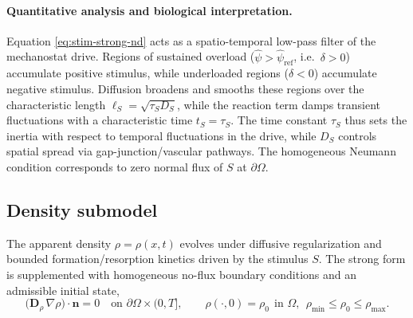 \paragraph{Quantitative analysis and biological interpretation.}
Equation \eqref{eq:stim-strong-nd} acts as a spatio-temporal low-pass filter of the mechanostat drive. Regions of sustained overload ($\hat{\psi}>\hat{\psi}_{\mathrm{ref}}$, i.e.\ $\delta>0$) accumulate positive stimulus, while underloaded regions ($\delta<0$) accumulate negative stimulus. Diffusion broadens and smooths these regions over the characteristic length
\(
\ell_S=\sqrt{\tau_S D_S}
\), while the reaction term damps transient fluctuations with a characteristic time
\(
t_S=\tau_S
\).
The time constant $\tau_S$ thus sets the inertia with respect to temporal fluctuations in the drive, while $D_S$ controls spatial spread via gap-junction/vascular pathways. The homogeneous Neumann condition corresponds to zero normal flux of $S$ at $\partial\Omega$.

\subsection*{Density submodel}\label{subsec:density-nd}
The apparent density $\rho=\rho(x,t)$ evolves under diffusive regularization and bounded formation/resorption kinetics driven by the stimulus $S$. The strong form is supplemented with homogeneous no-flux boundary conditions and an admissible initial state,
\begin{equation}\label{eq:density-bc-ic-nd}
\big(\mathbf{D}_\rho\,\nabla\rho\big)\!\cdot\!\mathbf{n}=0\quad\text{on }\partial\Omega\times(0,T],\qquad
\rho(\cdot,0)=\rho_0\ \ \text{in }\Omega,\ \ \rho_{\min}\le \rho_0\le \rho_{\max}.
\end{equation}

